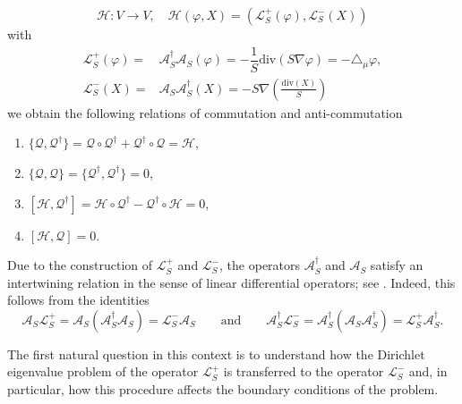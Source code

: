 \documentclass{amsart}
\theoremstyle{definition}
\theoremstyle{remark}
\numberwithin{equation}{section}
\newcommand{\diver}{{{\mathrm{div}}}}
\begin{document}
$$
\mathcal{H}:V\to V,\quad \mathcal{H}(\varphi,X)=\left(\mathscr{L}_S^+(\varphi),\mathscr{L}_S^{-}(X)\right)
$$
with 
\[
\begin{aligned}
\mathscr{L}_S^{+}(\varphi)=& \mathcal{A} ^\dag_S \mathcal{A}_S(\varphi)=-\dfrac{1}{S}\diver\left({S}\nabla\varphi \right)=-\triangle_\mu\varphi, \\
\mathscr{L}_S^{-}(X)=& \mathcal{A}_S\mathcal{A}^\dag_S(X)=-S \nabla\left( \frac{\diver(X)}{S} \right) 
\end{aligned}
\]
we obtain the following relations of commutation and anti-commutation
\begin{enumerate}
    \item $\{\mathcal{Q},\mathcal{Q}^\dag\}=\mathcal{Q}\circ \mathcal{Q}^\dag+\mathcal{Q}^\dag \circ\mathcal{Q}=\mathcal{H}$,
    \item $\{\mathcal{Q},\mathcal{Q}\}=\{\mathcal{Q}^\dag,\mathcal{Q}^\dag\}=0$,
    \item $[\mathcal{H},\mathcal{Q}^\dag]=\mathcal{H}\circ\mathcal{Q^\dag}-\mathcal{Q^\dag}\circ\mathcal{H}=0$,
    \item $[\mathcal{H},\mathcal{Q}]=0$.
\end{enumerate}
Due to the construction of $\mathscr{L}_S^{+}$ and $\mathscr{L}_S^{-}$, the operators $\mathcal{A}^\dag_S$ and $\mathcal{A}_S$ satisfy an intertwining relation in the sense of linear differential operators; see \cite{HouriSakamotoTatsumi2017,KnappStein1971}. Indeed, this follows from the identities
\begin{equation*}
 \mathcal{A}_S \mathscr{L}_S^{+}
 = \mathcal{A}_S \left( \mathcal{A}_S^\dag\mathcal{A}_S \right)
 = \mathscr{L}_S^{-}\mathcal{A}_S
 \qquad \text{and} \qquad
 \mathcal{A}_S^\dag\mathscr{L}_S^{-}
 = \mathcal{A}_S^\dag\left( \mathcal{A}_S \mathcal{A}^\dag_S \right)
 = \mathscr{L}_S^{+}\mathcal{A}_S^\dag.
\end{equation*}

The first natural question in this context is to understand how the Dirichlet eigenvalue problem of the operator $\mathscr{L}_S^{+}$ is transferred to the operator $\mathscr{L}_S^{-}$ and, in particular, how this procedure affects the boundary conditions of the problem.
\end{document}
